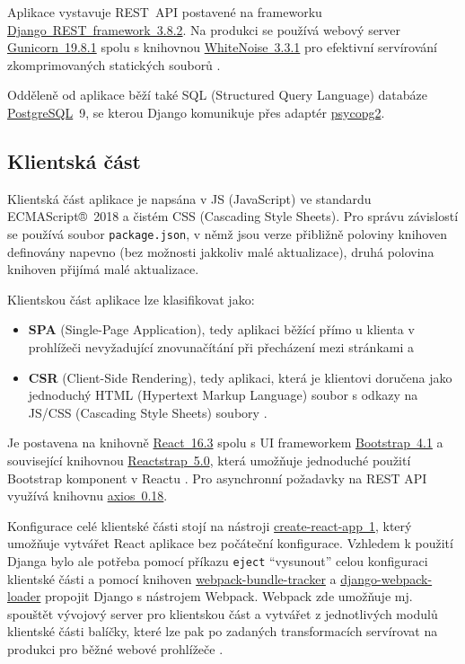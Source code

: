 Aplikace vystavuje REST~API postavené na frameworku \href{https://www.django-rest-framework.org/}{Django~REST~framework~3.8.2}. Na produkci se používá webový server \href{http://gunicorn.org/}{Gunicorn~19.8.1} spolu s knihovnou \href{http://whitenoise.evans.io/en/stable/}{WhiteNoise~3.3.1} pro efektivní servírování zkomprimovaných statických souborů \cite{whitenoise}.

Odděleně od aplikace běží také SQL (Structured Query Language) databáze \href{https://www.postgresql.org/}{PostgreSQL}~9, se kterou Django komunikuje přes adaptér \href{https://www.psycopg.org/}{psycopg2}.

\subsection{Klientská část}\label{subsec:bp-klientskacast}

Klientská část aplikace \cite{bp} je napsána v JS (JavaScript) ve standardu ECMAScript®~2018 a čistém CSS (Cascading Style Sheets). Pro správu závislostí se používá soubor \verb|package.json|, v němž jsou verze přibližně poloviny knihoven definovány napevno (bez možnosti jakkoliv malé aktualizace), druhá polovina knihoven přijímá malé aktualizace. 

Klientskou část aplikace lze klasifikovat jako: 
\begin{itemize}
    \item \textbf{SPA} (Single-Page Application), tedy aplikaci běžící přímo u klienta v prohlížeči nevyžadující znovunačítání při přecházení mezi stránkami \cite{spa1} a
    \item \textbf{CSR} (Client-Side Rendering), tedy aplikaci, která je klientovi doručena jako jednoduchý HTML (Hypertext Markup Language) soubor s odkazy na JS/CSS (Cascading Style Sheets) soubory \cite{csr-ssr}.
\end{itemize}

Je postavena na knihovně \href{https://reactjs.org/}{React~16.3} spolu s UI frameworkem \href{https://getbootstrap.com}{Bootstrap~4.1} a související knihovnou \href{https://reactstrap.github.io/}{Reactstrap~5.0}, která umožňuje jednoduché použití Bootstrap komponent v Reactu \cite{reactstrap}. Pro asynchronní požadavky na REST API využívá knihovnu \href{https://github.com/axios/axios}{axios~0.18}. 

Konfigurace celé klientské části stojí na nástroji \href{https://github.com/facebook/create-react-app}{create-react-app~1}, který umožňuje \cite{cra} vytvářet React aplikace bez počáteční konfigurace. Vzhledem k použití Djanga bylo ale potřeba \cite{bp} pomocí příkazu \verb|eject| \enquote{vysunout} celou konfiguraci klientské části a pomocí knihoven \href{https://github.com/owais/webpack-bundle-tracker}{webpack-bundle-tracker} a  \href{https://github.com/owais/django-webpack-loader}{django-webpack-loader} propojit Django s nástrojem Webpack. Webpack zde umožňuje mj. spouštět vývojový server pro klientskou část a vytvářet z jednotlivých modulů klientské části balíčky, které lze pak po zadaných transformacích servírovat na produkci pro běžné webové prohlížeče \cite{webpack-ackee}.

